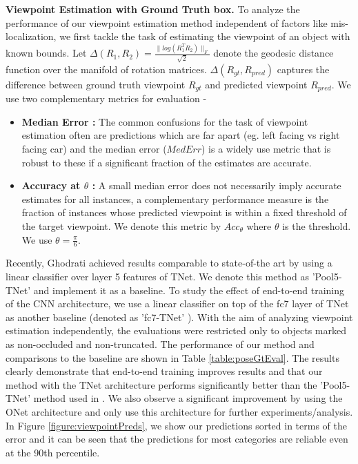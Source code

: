 \vspace{3mm}
\noindent \textbf{Viewpoint Estimation with Ground Truth box.}
To analyze the performance of our viewpoint estimation method independent of factors like mis-localization, we first tackle the task of estimating the viewpoint of an object with known bounds. Let $\Delta(R_1,R_2) = \frac{ \| log(R_1^TR_2)\|_F}{\sqrt{2}}$ denote the geodesic distance function over the manifold of rotation matrices. $\Delta(R_{gt},R_{pred})$ captures the difference between ground truth viewpoint $R_{gt}$ and predicted viewpoint $R_{pred}$. We use two complementary metrics for evaluation -
\begin{itemize}
\item \textbf{Median Error :} The common confusions for the task of viewpoint estimation often are predictions which are far apart (eg. left facing vs right facing car) and the median error ($MedErr$) is a widely use metric that is robust to these if a significant fraction of the estimates are accurate.
\item \textbf{Accuracy at $\theta$ :} A small median error does not necessarily imply accurate estimates for all instances, a complementary performance measure is the fraction of instances whose predicted viewpoint is within a fixed threshold of the target viewpoint. We denote this metric by $Acc_{\theta}$ where $\theta$ is the threshold. We use $\theta = \frac{\pi}{6}$.
\end{itemize}
Recently, Ghodrati \etal \cite{ghodrati14viewpoint} achieved results comparable to state-of-the art by using a linear classifier over layer 5 features of TNet. We denote this method as 'Pool5-TNet' and implement it as a baseline. To study the effect of end-to-end training of the CNN architecture, we use a linear classifier on top of the fc7 layer of TNet as another baseline (denoted as 'fc7-TNet' ). With the aim of  analyzing viewpoint estimation independently, the evaluations were restricted only to objects marked as non-occluded and non-truncated. The performance of our method and comparisons to the baseline are shown in Table \ref{table:poseGtEval}. The results clearly demonstrate that end-to-end training improves results and that our method with the TNet architecture performs significantly better than the 'Pool5-TNet' method used in \cite{ghodrati14viewpoint}. We also observe a significant improvement by using the ONet architecture and only use this architecture for further experiments/analysis. In Figure \ref{figure:viewpointPreds}, we show our predictions sorted in terms of the error and  it can be seen that the predictions for most categories are reliable even at the 90th percentile.

